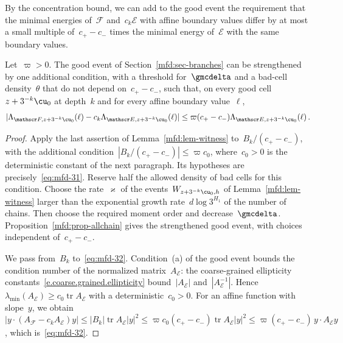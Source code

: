 \documentclass[11pt]{amsart}
\begin{document}
By the concentration bound, we can add to the good event the requirement that the minimal energies of~$\mathscr F$ and~$c_k\mathscr E$ with affine boundary values differ by at most a small multiple of~$c_+-c_-$ times the minimal energy of~$\mathscr E$ with the same boundary values.

\begin{corollary}
\label{mfd:cor-32}
Let~$\varpi>0$. The good event of Section~\ref{mfd:sec-branches} can be strengthened by one additional condition, with a threshold for~$\gmcdelta$ and a bad-cell density~$\theta$ that do not depend on~$c_+-c_-$, such that, on every good cell~$z+3^{-k}\cu_0$ at depth~$k$ and for every affine boundary value~$\ell$,
\begin{equation}
	|\Lambda_{\mathscr F,z+3^{-k}\cu_0}(\ell)-c_k\Lambda_{\mathscr E,z+3^{-k}\cu_0}(\ell)|\leq\varpi(c_+-c_-)\Lambda_{\mathscr E,z+3^{-k}\cu_0}(\ell)\,.
	\label{eq:mfd-32}
\end{equation}
\end{corollary}

\begin{proof}
Apply the last assertion of Lemma~\ref{mfd:lem-witness} to~$B_k/(c_+-c_-)$, with the additional condition~$|B_k/(c_+-c_-)|\leq\varpi c_0$, where~$c_0>0$ is the deterministic constant of the next paragraph. Its hypotheses are precisely~\eqref{eq:mfd-31}. Reserve half the allowed density of bad cells for this condition. Choose the rate~$\varkappa$ of the events~$W_{z+3^{-k}\cu_0,h}$ of Lemma~\ref{mfd:lem-witness} larger than the exponential growth rate~$d\log3^{H_1}$ of the number of chains. Then choose the required moment order and decrease~$\gmcdelta$. Proposition~\ref{mfd:prop-allchain} gives the strengthened good event, with choices independent of~$c_+-c_-$.

\smallskip

We pass from~$B_k$ to~\eqref{eq:mfd-32}. Condition~(a) of the good event bounds the condition number of the normalized matrix~$A_{\mathscr E}$: the coarse-grained ellipticity constants~\eqref{e.coarse.grained.ellipticity} bound~$|A_{\mathscr E}|$ and~$|A_{\mathscr E}^{-1}|$. Hence~$\lambda_{\min}(A_{\mathscr E})\geq c_0\operatorname{tr}A_{\mathscr E}$ with a deterministic~$c_0>0$. For an affine function with slope~$y$, we obtain~$|y\cdot(A_{\mathscr F}-c_kA_{\mathscr E})y|\leq|B_k|\operatorname{tr}A_{\mathscr E}|y|^2\leq\varpi c_0(c_+-c_-)\operatorname{tr}A_{\mathscr E}|y|^2\leq\varpi(c_+-c_-)\,y\cdot A_{\mathscr E}y$, which is~\eqref{eq:mfd-32}.
\end{proof}
\end{document}
